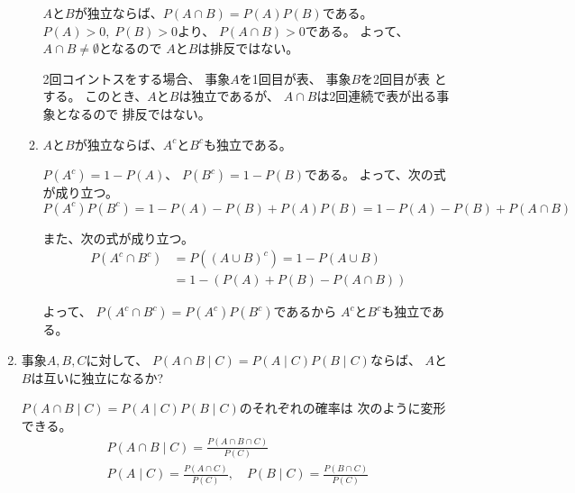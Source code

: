 \documentclass[12pt,b5paper]{ltjsarticle}
\begin{document}
\begin{enumerate}
\begin{enumerate}
              \dotfill

              $A$と$B$が独立ならば、$P(A\cap B)=P(A)P(B)$である。
              $P(A)>0, \; P(B)>0$より、
              $P(A\cap B)>0$である。
              よって、$A\cap B \ne \emptyset$となるので
              $A$と$B$は排反ではない。

              2回コイントスをする場合、
              事象$A$を1回目が表、
              事象$B$を2回目が表
              とする。
              このとき、$A$と$B$は独立であるが、
              $A\cap B$は2回連続で表が出る事象となるので
              排反ではない。

              \hrulefill
        \item $A$と$B$が独立ならば、$A^{c}$と$B^{c}$も独立である。

              \dotfill

              $P(A^{c}) = 1 - P(A)$、
              $P(B^{c}) = 1 - P(B)$である。
              よって、次の式が成り立つ。
              \begin{equation}
               P(A^{c})P(B^{c})
                =1- P(A)- P(B) + P(A)P(B)
                =1- P(A)- P(B) + P(A\cap B)
              \end{equation}

              また、次の式が成り立つ。
              \begin{align}
               P(A^{c}\cap B^{c})
               &= P( (A \cup B)^{c})
               = 1 - P(A\cup B)\\
               &= 1 - \left( P(A) + P(B) - P(A\cap B)\right)
              \end{align}

              よって、
              $P(A^{c}\cap B^{c}) = P(A^{c})P(B^{c})$であるから
              $A^{c}$と$B^{c}$も独立である。

              \hrulefill
      \end{enumerate}
 \item
      事象$A,B,C$に対して、
      $P(A\cap B \mid C) = P(A \mid C)P(B \mid C)$ならば、
      $A$と$B$は互いに独立になるか?

      \dotfill

      $P(A\cap B \mid C) = P(A \mid C)P(B \mid C)$のそれぞれの確率は
      次のように変形できる。
      \begin{gather}
       P(A\cap B \mid C) = \frac{P(A\cap B \cap C)}{P(C)}\\
       P(A \mid C) = \frac{P(A \cap C)}{P(C)},\quad
       P(B \mid C) = \frac{P(B \cap C)}{P(C)}
      \end{gather}


\end{enumerate}
\end{document}
